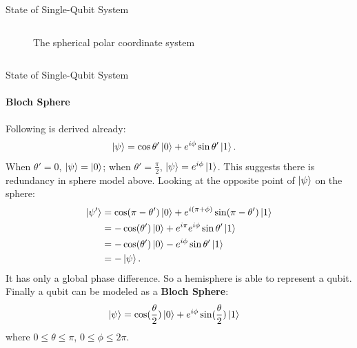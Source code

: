 \documentclass{beamer}
\begin{document}
\begin{frame}{State of Single-Qubit System\tiny\cite{blochsphere}}
{\begin{columns}
\begin{figure}
      \caption{The spherical polar coordinate system\tiny\cite{sphericalpolarcoordinate}}
    \end{figure}
  \end{columns}
  }%
\end{frame}

\begin{frame}{State of Single-Qubit System\tiny\cite{blochsphere}}
  \framesubtitle{Bloch Sphere}
  {\tiny
  Following is derived already:
  \begin{align*}
    \ket{\psi} &= \cos\theta'\ket{0}+e^{i\phi}\sin\theta'\ket{1} .
  \end{align*}
  When $\theta'=0$, $\ket{\psi}=\ket{0}$; when $\theta'=\frac{\pi}2$, $\ket{\psi}=e^{i\phi}\ket{1}$.
  This suggests there is redundancy in sphere model above.
  Looking at the opposite point of $\ket{\psi}$ on the sphere:
  \begin{align*}
    \ket{\psi'} &= \cos(\pi-\theta')\ket{0}+e^{i(\pi+\phi)}\sin(\pi-\theta')\ket{1} \\
     &= -\cos(\theta')\ket{0}+e^{i\pi}e^{i\phi}\sin\theta'\ket{1} \\
     &= -\cos(\theta')\ket{0}-e^{i\phi}\sin\theta'\ket{1} \\
     &= -\ket{\psi} .
  \end{align*}
  It has only a global phase difference. So a hemisphere is able to represent a qubit. Finally a qubit can be modeled as a \textbf{Bloch Sphere}:
  \begin{align*}
    \ket{\psi} &= \cos(\frac{\theta}2)\ket{0}+e^{i\phi}\sin(\frac{\theta}2)\ket{1}
  \end{align*}
  where $0\leqslant\theta\leqslant\pi$, $0\leqslant\phi\leqslant2\pi$.
  }%
\end{frame}
\end{document}
